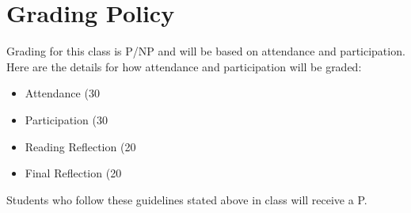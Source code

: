 \documentclass{article}
\begin{document}
\section{Grading Policy}
Grading for this class is P/NP and will be based on attendance and participation. Here are the details for how attendance and participation will be graded:
\newline
\begin{itemize}
	\item Attendance (30%
    \item Participation (30%
    \item Reading Reflection (20%
    \item Final Reflection (20%
\end{itemize}
Students who follow these guidelines stated above in class will receive a P.  
  
\end{document}
